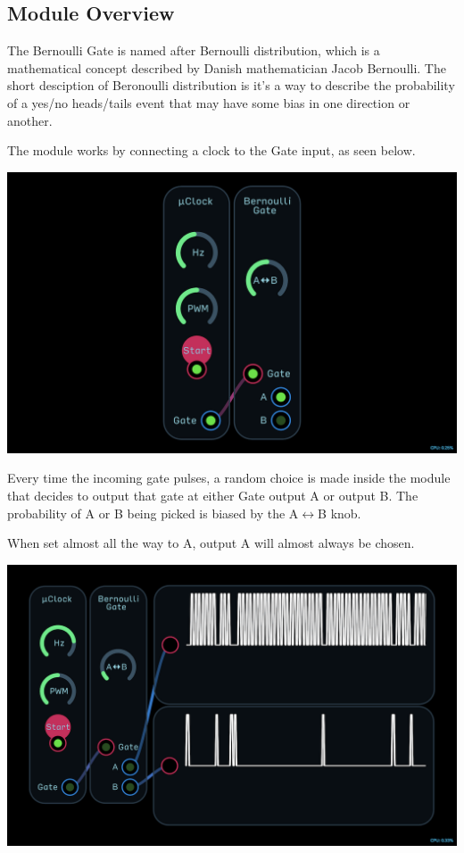 \documentclass[11pt]{book}
\begin{document}
\begin{multicols*}{2}

\subsection*{Module Overview}

The Bernoulli Gate is named after Bernoulli distribution, which is a mathematical concept described by Danish mathematician Jacob Bernoulli. The short desciption of Beronoulli distribution is it's a way to describe the probability of a yes/no heads/tails event that may have some bias in one direction or another.

The module works by connecting a clock to the Gate input, as seen below.

\begin{center}
\includegraphics[width=0.95\linewidth]{bernoulli-gate-fig1.png}
\end{center}

Every time the incoming gate pulses, a random choice is made inside the module that decides to output that gate at either Gate output A or output B. The probability of A or B being picked is biased by the A$\leftrightarrow$B knob.

When set almost all the way to A, output A will almost always be chosen.

\begin{center}
\includegraphics[width=0.95\linewidth]{bernoulli-gate-fig2.png}
\end{center}


\end{multicols*}
\end{document}
